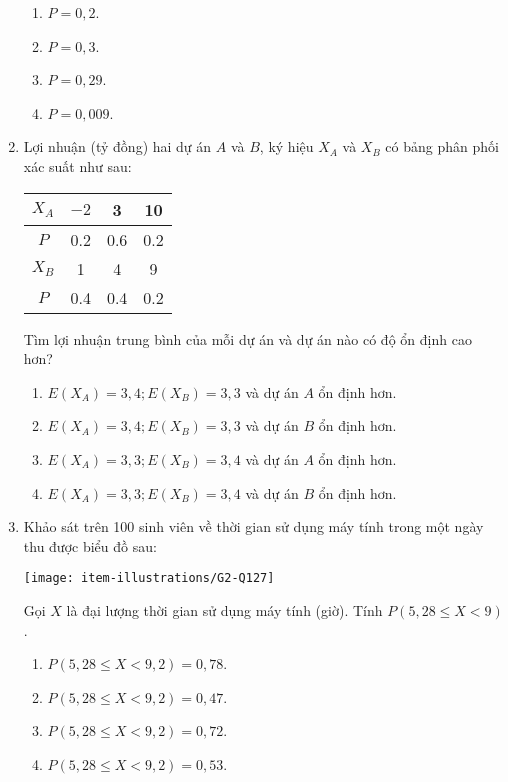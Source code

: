 \begin{enumerate}[label=\textbf{Câu \arabic*.},align=left,left=0cm..0cm,itemindent=*]
\begin{enumerate}[label=\textbf{\Alph*.},align=left,left=1cm..0cm,itemindent=*]
		\item $P=0,2$. \item $P=0,3$. \item $P=0,29$. \item $P=0,009$.
	\end{enumerate}
	\item Lợi nhuận (tỷ đồng) hai dự án $A$ và $B$, ký hiệu $X_A$ và $X_B$ có bảng phân phối xác suất như sau:
	\begin{longtable}{|c|c|c|c|}\hline
	$X_A$ & $-2$ & 3   & 10  \\ \hline
	$P$   & 0.2  & 0.6 & 0.2 \\ \hline\hline
	$X_B$ & 1 	& 4   & 9   \\ \hline
	$P$   & 0.4  & 0.4 & 0.2 \\ \hline
	\end{longtable}
	Tìm lợi nhuận trung bình của mỗi dự án và dự án nào có độ ổn định cao hơn?
	\begin{enumerate}[label=\textbf{\Alph*.},align=left,left=1cm..0cm,itemindent=*]
		\item $E\left( {{X}_{A}} \right)=3,4; E\left( {{X}_{B}} \right)=3,3$ và dự án $A$ ổn định hơn.
		\item $E\left( {{X}_{A}} \right)=3,4; E\left( {{X}_{B}} \right)=3,3$ và dự án $B$ ổn định hơn.
		\item $E\left( {{X}_{A}} \right)=3,3; E\left( {{X}_{B}} \right)=3,4$ và dự án $A$ ổn định hơn.
		\item $E\left( {{X}_{A}} \right)=3,3; E\left( {{X}_{B}} \right)=3,4$ và dự án $B$ ổn định hơn.
	\end{enumerate}
	\item Khảo sát trên 100 sinh viên về thời gian sử dụng máy tính trong một ngày thu được biểu đồ sau:\par
	{\centering\texttt{[image: item-illustrations/G2-Q127]}\par}
	Gọi $X$ là đại lượng thời gian sử dụng máy tính (giờ). Tính $P\left( 5,28\leqslant X<9 \right)$.
	\begin{enumerate}[label=\textbf{\Alph*.},align=left,left=1cm..0cm,itemindent=*]
		\item $P\left( 5,28\leqslant X<9,2 \right)=0,78$.
		\item $P\left( 5,28\leqslant X<9,2 \right)=0,47$.
		\item $P\left( 5,28\leqslant X<9,2 \right)=0,72$.
		\item $P\left( 5,28\leqslant X<9,2 \right)=0,53$.
	\end{enumerate}

\end{enumerate}
